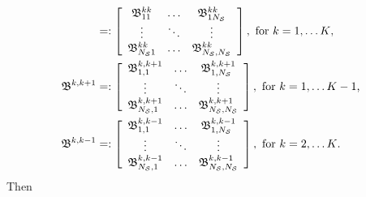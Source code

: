 \begin{align*}
    &=:\left[\begin{array}{ccc} {  {\mathfrak{\bs B}}}_{11}^{kk} &  \hdots &  {  {\mathfrak{\bs B}}}^{kk}_{1N_\calS}  \\ \vdots &\ddots & \vdots \\   {  {\mathfrak{\bs B}}}^{kk}_{N_\calS1} &  \hdots &  {  {\mathfrak{\bs B}}}^{kk}_{N_\calS,N_\calS} \end{array}\right], \mbox{ for \(k=1,\dots K\),}
\\ {  {\mathfrak{\bs B}}}^{k,k+1}%
%
&=:\left[\begin{array}{ccc} {  {\mathfrak{\bs B}}}^{k,k+1}_{1,1}& \hdots &  {  {\mathfrak{\bs B}}}^{k,k+1}_{1,N_\calS}\\  \vdots &\ddots & \vdots \\  {  {\mathfrak{\bs B}}}^{k,k+1}_{N_\calS,1} & \hdots & {  {\mathfrak{\bs B}}}^{k,k+1}_{N_\calS,N_\calS} \end{array}\right],\mbox{ for \(k=1,\dots K-1\),}
%
\\ {  {\mathfrak{\bs B}}}^{k,k-1}%
%
&=:\left[\begin{array}{ccc} {  {\mathfrak{\bs B}}}^{k,k-1}_{1,1}& \hdots &  {  {\mathfrak{\bs B}}}^{k,k-1}_{1,N_\calS}\\  \vdots &\ddots & \vdots \\  {  {\mathfrak{\bs B}}}^{k,k-1}_{N_\calS,1} & \hdots & {  {\mathfrak{\bs B}}}^{k,k-1}_{N_\calS,N_\calS} \end{array}\right], \mbox{ for \(k=2,\dots K\).}
\end{align*} 
Then
